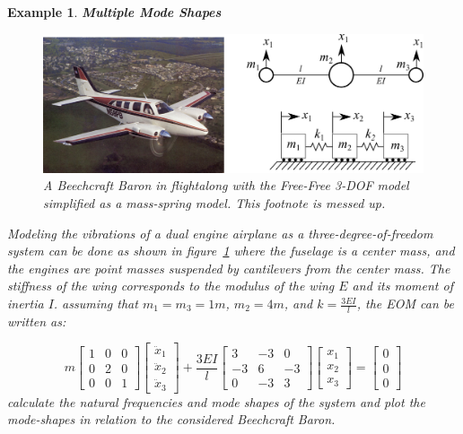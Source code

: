 \documentclass[12pt,letter]{article}
\newtheorem{ex}{Example}
\numberwithin{ex}{section} %
\newenvironment{example}{\begin{mdframed}[middlelinewidth=0.5mm]\begin{ex}\normalfont}{\end{ex}\end{mdframed}}
\numberwithin{re}{section} %
\newcommand{\rd}[1]{\textcolor[rgb]{0.75,0.00,0.00}{#1}}
\begin{document}
\begin{example}
\textbf{Multiple Mode Shapes}



\begin{figure}[H]
	\centering
	\includegraphics[width=\linewidth]{../Figures/mode_shape_aiplane_example.png}
	\caption{A Beechcraft Baron in flight\protect\footnotemark[1] along with the Free-Free 3-DOF model simplified as a mass-spring model. \rd{This footnote is messed up.}}
	\label{fig:mode_shape_aiplane_example}
\end{figure}

Modeling the vibrations of a dual engine airplane as a three-degree-of-freedom system can be done as shown in figure~\ref{fig:mode_shape_aiplane_example} where the fuselage is a center mass, and the engines are point masses suspended by cantilevers from the center mass. The stiffness of the wing corresponds to the modulus of the wing $E$ and its moment of inertia $I$. assuming that $m_1=m_3=1m$, $m_2=4m$, and $k=\frac{3EI}{l}$, the EOM can be written as:

\begin{equation}
	  m\begin{bmatrix} 1 & 0 & 0 \\    0  & 2 & 0 \\ 0  & 0 & 1 \end{bmatrix} \begin{bmatrix} \ddot{x}_1 \\    \ddot{x}_2 \\    \ddot{x}_3  \end{bmatrix} + \frac{3EI}{l} \begin{bmatrix} 3 & -3 & 0 \\  -3  & 6 & -3 \\  0  & -3 & 3 \end{bmatrix} \begin{bmatrix} x_1 \\    x_2 \\    x_3 \end{bmatrix} = \begin{bmatrix} 0 \\  0 \\ 0 \end{bmatrix} 
\end{equation}
calculate the natural frequencies and mode shapes of the system and plot the mode-shapes in relation to the considered Beechcraft Baron.


\end{example}
\end{document}
